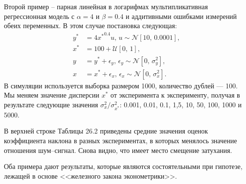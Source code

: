 Второй пример – парная линейная в логарифмах мультипликативная регрессионная модель с $\alpha=4$ и $\beta=0.4$ и аддитивными ошибками измерений обеих переменных. В этом случае постановка следующая:
\begin{align*}
y^* &= 4{x^*}^{0.4}u, \, u \sim \mathcal{N}[10, \, 0.0001], \\
x^* &= 100+ \mathcal{U}[0, \, 1], \\
y &= y^*+ \epsilon_y, \, \epsilon_y \sim \mathcal{N}[0, \, \sigma^2_y], \\
x &= x^*+ \epsilon_x, \, \epsilon_x \sim \mathcal{N}[0, \, \sigma^2_x].
\end{align*}
В симуляции используется выборка размером 1000, количество дублей --- 100. Мы меняем значение дисперсии $x^*$ от эксперимента к эксперименту, получая в результате следующие значения $\sigma^2_{x} / \sigma^2_{x^*}$: 0.001, 0.01, 0.1, 1,5, 10, 50, 100, 1000 и 5000.

В верхней строке Таблицы 26.2 приведены средние значения оценок коэффициента наклона в разных экспериментах, в которых менялось значение отношения шум--сигнал. Снова видно, что имеет место смещение затухания.

Оба примера дают результаты, которые являются состоятельными при гипотезе, лежащей в основе <<железного закона эконометрики>>.

